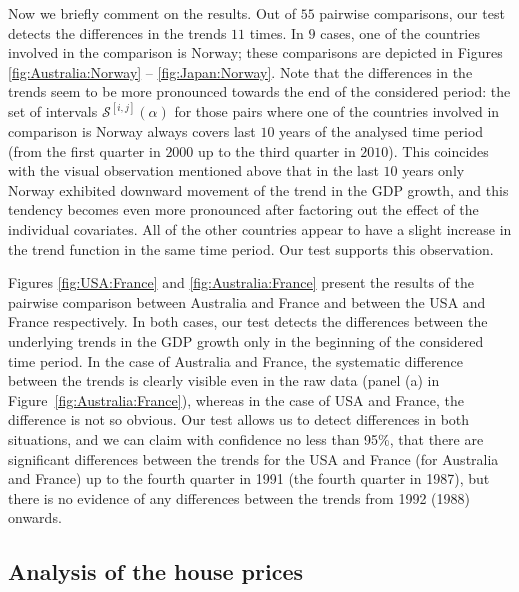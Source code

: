 \documentclass[a4paper,12pt]{article}
\begin{document}
Now we briefly comment on the results. Out of $55$ pairwise comparisons, our test detects the differences in the trends $11$ times. In $9$ cases, one of the countries involved in the comparison is Norway; these comparisons are depicted in Figures \ref{fig:Australia:Norway} -- \ref{fig:Japan:Norway}. Note that the differences in the trends seem to be more pronounced towards the end of the considered period: the set of intervals $\mathcal{S}^{[i, j]}(\alpha)$ for those pairs where one of the countries involved in comparison is Norway always covers last $10$ years of the analysed time period (from the first quarter in $2000$ up to the third quarter in $2010$). This coincides with the visual observation mentioned above that in the last $10$ years only Norway exhibited downward movement of the trend in the GDP growth, and this tendency becomes even more pronounced after factoring out the effect of the individual covariates. All of the other countries appear to have a slight increase in the trend function in the same time period. Our test supports this observation.

Figures \ref{fig:USA:France} and \ref{fig:Australia:France} present the results of the pairwise comparison between Australia and France and between the USA and France respectively. In both cases, our test detects the differences between the underlying trends in the GDP growth only in the beginning of the considered time period. In the case of Australia and France, the systematic difference between the trends is clearly visible even in the raw data (panel (a) in Figure~\ref{fig:Australia:France}), whereas in the case of USA and France, the difference is not so obvious. Our test allows us to detect differences in both situations, and we can claim with confidence no less than 95\%, that there are significant differences between the trends for the USA and France (for Australia and France) up to the fourth quarter in 1991 (the fourth quarter in 1987), but there is no evidence of any differences between the trends from 1992 (1988) onwards.

\subsection{Analysis of the house prices}\label{subsec:app:hp}
\end{document}
